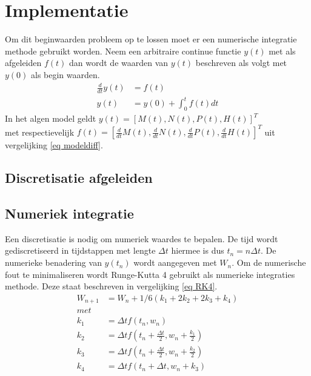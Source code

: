 \section{Implementatie}
Om dit beginwaarden probleem op te lossen moet er een numerische integratie methode gebruikt worden. Neem een arbitraire continue functie $y(t)$ met als afgeleiden $f(t)$ dan wordt de waarden van $y(t)$ beschreven als volgt met $y(0)$ als begin waarden.
\begin{equation}
    \begin{split}
    \frac{d}{dt} y(t) &= f(t) \\
    y(t) &= y(0)+\int_{0}^t f(t)dt
    \end{split}
\end{equation}
In het algen model geldt $y(t)=\left[M(t), N(t), P(t), H(t) \right]^T$ \\
met respectievelijk $f(t)=\left[\frac{d}{dt}M(t), \frac{d}{dt}N(t), \frac{d}{dt}P(t), \frac{d}{dt}H(t) \right]^T$ uit vergelijking \ref{eq modeldiff}.

\subsection{Discretisatie afgeleiden}

\subsection{Numeriek integratie}
Een discretisatie is nodig om numeriek waardes te bepalen. De tijd wordt gediscretiseerd in tijdstappen met lengte $\Delta t$ hiermee is dus $t_n=n\Delta t$. De numerieke benadering van $y(t_n)$ wordt aangegeven met $W_n$. Om de numerische fout te minimaliseren wordt Runge-Kutta 4 gebruikt als numerieke integraties methode. Deze staat beschreven in vergelijking \ref{eq RK4}.
\begin{equation}
    \begin{split}
            W_{n+1} &= W_n+1/6(k_1+2k_2+2k_3+k_4)\\
            met\\
            k_1 &= \Delta t f\left(t_n,w_n\right)\\
            k_2 &= \Delta t f\left(t_n+\frac{\Delta t}{2},w_n+\frac{k_1}{2}\right)\\
            k_3 &= \Delta t f\left(t_n+\frac{\Delta t}{2},w_n+\frac{k_2}{2}\right)\\
            k_4 &= \Delta t f\left(t_n+\Delta t ,w_n+k_3\right)
            \label{eq RK4}
    \end{split}
\end{equation}

